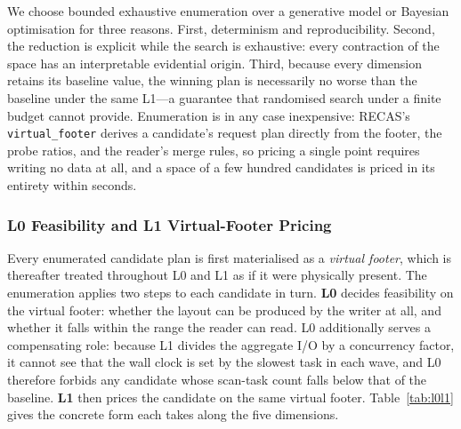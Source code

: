 We choose bounded exhaustive enumeration over a generative model or Bayesian
optimisation for three reasons. First, determinism and reproducibility. Second,
the reduction is explicit while the search is exhaustive: every contraction of
the space has an interpretable evidential origin. Third, because every dimension
retains its baseline value, the winning plan is necessarily no worse than the
baseline under the same L1---a guarantee that randomised search under a finite
budget cannot provide. Enumeration is in any case inexpensive: RECAS's
\texttt{virtual\_footer} derives a candidate's request plan directly from the
footer, the probe ratios, and the reader's merge rules, so pricing a single point
requires writing no data at all, and a space of a few hundred candidates is
priced in its entirety within seconds.

\subsubsection{L0 Feasibility and L1 Virtual-Footer Pricing}
\label{sec:l0l1}

Every enumerated candidate plan is first materialised as a \emph{virtual
footer}, which is thereafter treated throughout L0 and L1 as if it were
physically present. The enumeration applies two steps to each candidate in
turn. \textbf{L0} decides feasibility on the virtual footer: whether the layout
can be produced by the writer at all, and whether it falls within the range the
reader can read. L0 additionally serves a compensating role: because L1 divides
the aggregate I/O by a concurrency factor, it cannot see that the wall clock is
set by the slowest task in each wave, and L0 therefore forbids any candidate
whose scan-task count falls below that of the baseline. \textbf{L1} then prices
the candidate on the same virtual footer. Table~\ref{tab:l0l1} gives the
concrete form each takes along the five dimensions.


